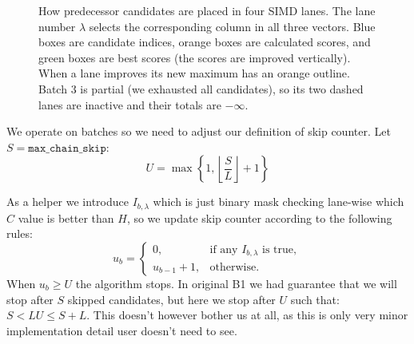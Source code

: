 \begin{figure}[H]
\caption{How predecessor candidates are placed in four SIMD lanes. The lane number \(\lambda\)
selects the corresponding column in all three vectors.  Blue boxes are
candidate indices, orange boxes are calculated scores, and green boxes
are best scores (the scores are improved vertically).  When a lane improves its new maximum has an orange outline.  Batch 3 is partial (we exhausted all candidates), so its two dashed lanes are inactive and their
totals are \(-\infty\).}
\label{fig:chaining-simd-lane-placement}
\end{figure}



We operate on batches so we need to adjust our definition of skip counter.
Let \(S=\texttt{max\_chain\_skip}\):
\begin{equation}
 U=\max\!\left\{1,\left\lfloor\frac{S}{L}\right\rfloor+1\right\}
\label{eq:chaining-batch-limit}
\end{equation}

As a helper we introduce $I_{b,\lambda}$ which is just binary mask checking lane-wise which $C$ value is better than $H$, so we update skip counter according to the following rules:
\begin{equation}
 u_b=
 \begin{cases}
   0,&\text{if any }I_{b,\lambda}\text{ is true},\\
   u_{b-1}+1,&\text{otherwise.}
 \end{cases}
 \label{eq:chaining-b5-counter}
\end{equation}
When \(u_b\geq U\) the algorithm stops. In original B1 we had guarantee that we will stop after $S$ skipped candidates, but here we stop after $U$ such that: \(S<LU\leq S+L\). This doesn't however bother us at all, as this is only very minor implementation detail user doesn't need to see.

